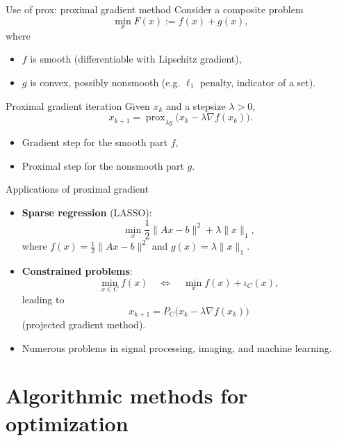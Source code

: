 \documentclass[aspectratio=169]{beamer}
\begin{document}

\begin{frame}{Use of prox: proximal gradient method}
Consider a composite problem
\[
\min_x F(x) := f(x) + g(x),
\]
where
\begin{itemize}
    \item $f$ is smooth (differentiable with Lipschitz gradient),
    \item $g$ is convex, possibly nonsmooth (e.g. $\ell_1$ penalty, indicator of a set).
\end{itemize}

\begin{block}{Proximal gradient iteration}
Given $x_k$ and a stepsize $\lambda>0$,
\[
x_{k+1}
=
\operatorname{prox}_{\lambda g}\Big(x_k - \lambda \nabla f(x_k)\Big).
\]
\end{block}

\begin{itemize}
    \item Gradient step for the smooth part $f$,
    \item Proximal step for the nonsmooth part $g$.
\end{itemize}
\end{frame}

\begin{frame}{Applications of proximal gradient}
\begin{itemize}
    \item \textbf{Sparse regression} (LASSO):
    \[
    \min_x \frac{1}{2}\|Ax-b\|^2 + \lambda \|x\|_1,
    \]
    where $f(x)=\frac{1}{2}\|Ax-b\|^2$ and $g(x)=\lambda\|x\|_1$.
    \pause
    \item \textbf{Constrained problems}:
    \[
    \min_{x\in C} f(x)
    \quad \Longleftrightarrow \quad
    \min_x f(x) + \iota_C(x),
    \]
    leading to
    \[
    x_{k+1}=P_C\big(x_k - \lambda \nabla f(x_k)\big)
    \]
    (projected gradient method).
    \item Numerous problems in signal processing, imaging, and machine learning.
\end{itemize}
\end{frame}

\section{Algorithmic methods for optimization}
\end{document}
